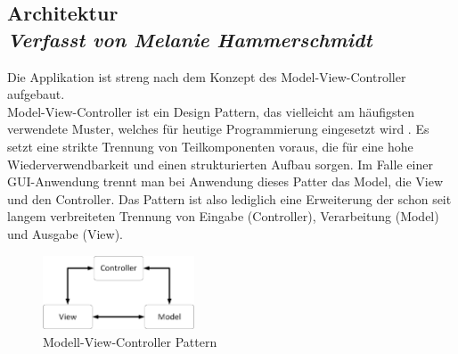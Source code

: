 \newpage
\subsection[Architektur]{Architektur \label{sec:Architektur}
 \\ \textnormal{\small{\textit {Verfasst von Melanie Hammerschmidt}}}}
 
Die Applikation ist streng nach dem Konzept des Model-View-Controller aufgebaut.
\\
Model-View-Controller ist ein Design Pattern, das vielleicht am häufigsten verwendete Muster, welches für heutige Programmierung eingesetzt wird \cite{MVC}. Es setzt eine strikte Trennung von Teilkomponenten voraus, die für eine hohe Wiederverwendbarkeit und einen strukturierten Aufbau sorgen. Im Falle einer GUI-Anwendung trennt man bei Anwendung dieses Patter das Model, die View und den Controller. Das Pattern ist also lediglich eine Erweiterung der schon seit langem verbreiteten Trennung von Eingabe (Controller), Verarbeitung (Model) und Ausgabe (View). 

\begin{figure}[h]
\centering
\includegraphics[width=0.4\textwidth]{ref/images/mvc.png}
\caption[Modell-View-Controller Pattern]{Modell-View-Controller Pattern}
\label{fig:MVC}
\end{figure} 

